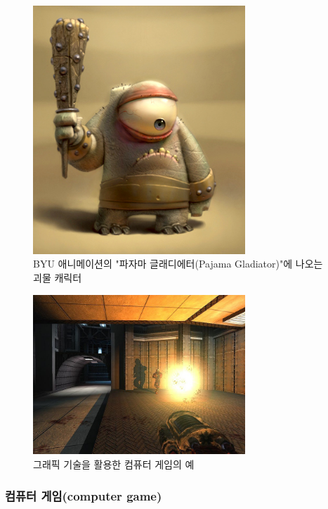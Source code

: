 \begin{figure}[h!]
  \centering
    \includegraphics[width=8cm]{OGL_intro/animation.jpg}
    \caption{BYU 애니메이션의 "파자마 글래디에터(Pajama Gladiator)"에 나오는 괴물 캐릭터}
    \label{fig:OGL_intro:animation}
\end{figure}

\begin{figure}[h!]
  \centering
    \includegraphics[width=8cm]{OGL_intro/game.jpg}
    \caption{그래픽 기술을 활용한 컴퓨터 게임의 예}
    \label{fig:OGL_intro:game}
\end{figure}

\subsubsection{컴퓨터 게임(computer game)}

